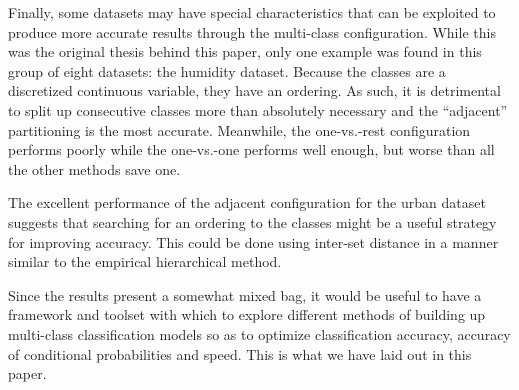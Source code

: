 Finally, some datasets may have special characteristics that can be exploited
to produce more accurate results through the multi-class configuration.
While this was the original thesis behind this paper,
only one example was found in this group of eight datasets: 
the humidity dataset.
Because the classes are a discretized continuous variable, they have an
ordering. As such, it is detrimental to split up consecutive classes more
than absolutely necessary and the ``adjacent'' partitioning is the most
accurate. Meanwhile, the one-vs.-rest configuration performs poorly while
the one-vs.-one performs well enough, but worse than all the other methods
save one.

The excellent performance of the adjacent configuration for the urban
dataset suggests that searching for an ordering to the classes might be a
useful strategy for improving accuracy.
This could be done using inter-set distance in a manner similar to the empirical hierarchical method.

Since the results present a somewhat mixed bag, it would be useful to
have a framework and toolset with which to explore different methods of
building up multi-class classification models so as to optimize classification
accuracy, accuracy of conditional probabilities and speed.
This is what we have laid out in this paper.

